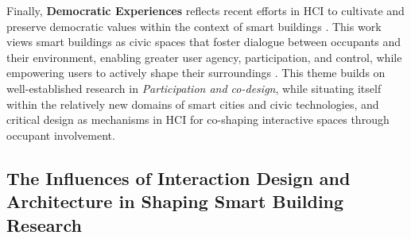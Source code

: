 Finally, \textbf{Democratic Experiences} reflects recent efforts in HCI to cultivate and preserve democratic values within the context of smart buildings \cite{dalton2020habitech}. This work views smart buildings as civic spaces that foster dialogue between occupants and their environment, enabling greater user agency, participation, and control, while empowering users to actively shape their surroundings \cite{dalton2020habitech}. This theme builds on well-established research in \textit{Participation and co-design}, while situating itself within the relatively new domains of smart cities and civic technologies, and critical design as mechanisms in HCI for co-shaping interactive spaces through occupant involvement.

\subsection{The Influences of Interaction Design and Architecture in Shaping Smart Building Research}
